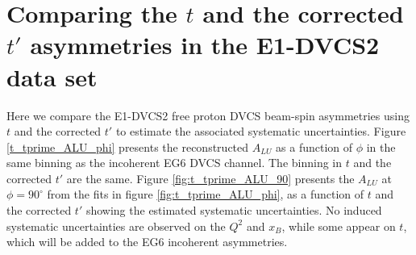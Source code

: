 \documentclass[a4paper,11pt,twoside]{article}
\begin{document}





\section{Comparing the $t$ and the corrected $t'$ asymmetries in the E1-DVCS2 
data set}
Here we compare the E1-DVCS2 free proton DVCS beam-spin asymmetries using $t$ 
and the corrected $t'$ to estimate the associated systematic uncertainties.  
Figure \ref{t_tprime_ALU_phi} presents the reconstructed $A_{LU}$ as a function 
of $\phi$ in the same binning as the incoherent EG6 DVCS channel. The binning 
in $t$ and the corrected $t'$ are the same. Figure \ref{fig:t_tprime_ALU_90} 
presents the $A_{LU}$ at $\phi = 90^{\circ}$ from the fits in figure 
\ref{fig:t_tprime_ALU_phi}, as a function of $t$ and the corrected $t'$ showing 
the estimated systematic uncertainties. No induced systematic uncertainties are 
observed on the $Q^{2}$ and $x_B$, while some appear on $t$, which will be 
added to the EG6 incoherent asymmetries. 
\end{document}
